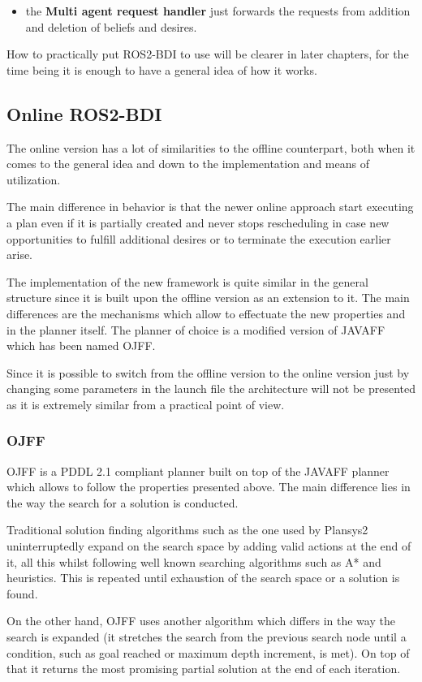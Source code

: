 \begin{itemize}
    \item the \textbf{Multi agent request handler} just forwards the requests from addition and deletion of beliefs and desires.
\end{itemize}
How to practically put ROS2-BDI to use will be clearer in later chapters, for the time being it is enough to have a general idea of how it works.
\cite{ros2_bdi_offline_article}
\cite{ros2_bdi_docs}
\cite{devis_thesis}
\cite{ros2_bdi_offline_demonstration}
\subsection{Online ROS2-BDI} The online version has a lot of similarities to the offline counterpart, both when it comes to the general idea and down to the implementation and means of utilization. 
\par
The main difference in behavior is that the newer online approach start executing a plan even if it is partially created and never stops rescheduling in case new opportunities to fulfill additional desires or to terminate  the execution earlier arise.
\par 
The implementation of the new framework is quite similar in the general structure since it is built upon the offline version as an extension to it. The main differences are the mechanisms which allow to effectuate the new properties and in the planner itself. The planner of choice is a modified version of JAVAFF which has been named OJFF. 
\par 
Since it is possible to switch from the offline version to the online version just by changing some parameters in the launch file the architecture will not be presented as it is extremely similar from a practical point of view.
\subsubsection{OJFF} OJFF is a PDDL 2.1 compliant planner built on top of the JAVAFF planner which allows to follow the properties presented above. The main difference lies in the way the search for a solution is conducted. 
\par
Traditional solution finding algorithms such as the one used by Plansys2 uninterruptedly expand on the search space by adding valid actions at the end of it, all this whilst following well known searching algorithms such as A* and heuristics. This is repeated until exhaustion of the search space or a solution is found. 
\par
On the other hand, OJFF uses another algorithm which differs in the way the search is expanded (it stretches the search from the previous search node until a condition, such as goal reached or maximum depth increment, is met). On top of that it returns the most promising partial solution at the end of each iteration.
